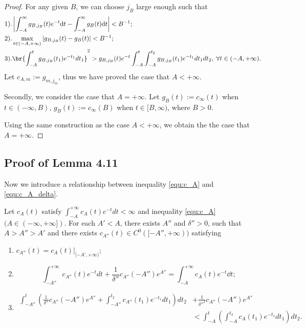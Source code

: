 \documentclass[twoside,openany,12pt]{beautynote}
\begin{document}
\begin{proof}
  For any given $B$, we can choose $j_{B}$ large enough such that
\begin{equation}
\begin{split}
&1).\left|\int_{-A}^{\infty}g_{B,j_{B}}(t)e^{-t} \dd t-\int_{-A}^{\infty}g_{B}(t)\dd t \right|<B^{-1};
\\
&2).\max_{t\in(-A,+\infty)}|g_{B,j_{B}}(t)-g_{B}(t)|<B^{-1};
\\
&3).\br{\int_{-A}^{t}g_{B,j_{B}}(t_{1})e^{-t_{1}}dt_{1}}^{2}
>g_{B,j_{B}}(t)e^{-t}\int_{-A}^{t}
\int_{-A}^{t_{2}}g_{B,j_{B}}(t_{1})e^{-t_{1}}dt_{1}dt_{2},\; \forall t\in(-A,+\infty).
\end{split}
\end{equation}
Let $c_{A,m}:=g_{m,j_{m}}$, thus we have proved the case that
$A<+\infty$.

Secondly, we consider the case that $A=+\infty$. Let
$g_{B}(t):=c_{\infty}(t)$ when $t\in(-\infty,B)$,
$g_{B}(t):=c_{\infty}(B)$ when $t\in[B,\infty)$, where $B>0$.

Using the same construction as the case $A<+\infty$, we obtain the
the case that $A=+\infty$.
\end{proof}

\subsection{Proof of Lemma 4.11}

Now we introduce a relationship between inequality \ref{equ:c_A} and
\ref{equ:c_A_delta}.

\begin{lemma}\label{l:relate_c_A_delta}
  Let $c_{A}(t)$ satisfy
$\int_{-A}^{+\infty}c_{A}(t)e^{-t}dt<\infty$ and inequality
\ref{equ:c_A} $(A\in(-\infty,+\infty])$. For each $A'<A$, there
exists $A''$ and $\delta''>0$, such that $A>A''>A'$ and there exists
$c_{A''}(t)\in C^{0}([-A'',+\infty))$ satisfying
\begin{enumerate}[label=\roman*)]
  \item $c_{A''}(t)=c_{A}(t)|_{[-A',+\infty)}$;
  \item $$\int_{-A''}^{+\infty}c_{A''}(t)e^{-t}dt+\frac{1}{\delta''}c_{A''}(-A'')e^{A''}=
\int_{-A}^{+\infty}c_{A}(t)e^{-t}\dd t ;$$
\item \begin{align*}
  \int_{-A''}^{t}\left(\frac{1}{\delta''}c_{A''}(-A'')e^{A''}+\int_{-A''}^{t_{2}}c_{A''}(t_{1})e^{-t_{1}}dt_{1}\right)
dt_{2}&+\frac{1}{{\delta''}^{2}}c_{A''}(-A'')e^{A''} \\
&<\int_{-A}^{t}\left(\int_{-A}^{t_{2}}c_{A}(t_{1})e^{-t_{1}}dt_{1}\right)
dt_{2}.\end{align*}
\end{enumerate}
\end{lemma}
\end{document}
